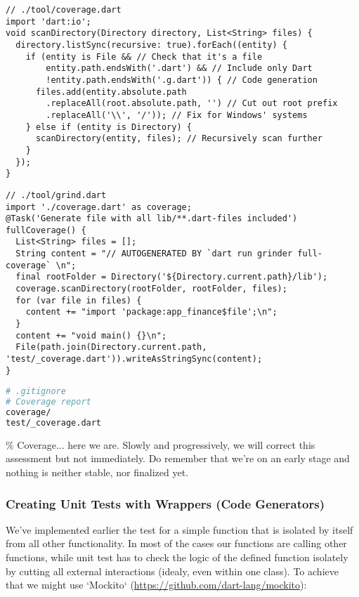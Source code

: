 \begin{lstlisting}
// ./tool/coverage.dart
import 'dart:io';
void scanDirectory(Directory directory, List<String> files) {
  directory.listSync(recursive: true).forEach((entity) {
    if (entity is File && // Check that it's a file
        entity.path.endsWith('.dart') && // Include only Dart
        !entity.path.endsWith('.g.dart')) { // Code generation
      files.add(entity.absolute.path
        .replaceAll(root.absolute.path, '') // Cut out root prefix
        .replaceAll('\\', '/')); // Fix for Windows' systems
    } else if (entity is Directory) {
      scanDirectory(entity, files); // Recursively scan further
    }
  });
}
\end{lstlisting}

\begin{lstlisting}
// ./tool/grind.dart
import './coverage.dart' as coverage;
@Task('Generate file with all lib/**.dart-files included')
fullCoverage() {
  List<String> files = [];
  String content = "// AUTOGENERATED BY `dart run grinder full-coverage` \n";
  final rootFolder = Directory('${Directory.current.path}/lib');
  coverage.scanDirectory(rootFolder, rootFolder, files);
  for (var file in files) {
    content += "import 'package:app_finance$file';\n";
  }
  content += "void main() {}\n";
  File(path.join(Directory.current.path, 'test/_coverage.dart')).writeAsStringSync(content);
}
\end{lstlisting}

\begin{lstlisting}[language=bash]
# .gitignore
# Coverage report
coverage/
test/_coverage.dart
\end{lstlisting}

\% Coverage... here we are. Slowly and progressively, we will correct this assessment but not immediately.
Do remember that we're on an early stage and nothing is neither stable, nor finalized yet.


\subsubsection{Creating Unit Tests with Wrappers (Code Generators)} \label{ut-code-generator}

We've implemented earlier the test for a simple function that is isolated by itself from all other functionality. 
In most of the cases our functions are calling other functions, while unit test has to check the logic of the defined 
function isolately by cutting all external interactions (idealy, even within one class). To achieve that we might
use `Mockito` (\href{https://github.com/dart-lang/mockito}{https://github.com/dart-lang/mockito}):

